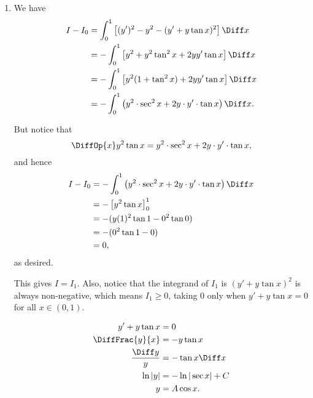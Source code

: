 \Question{\currfilebase}
\begin{enumerate}
    \item We have
          \begin{align*}
              I - I_0 & = \int_{0}^{1} \left[(y')^2 - y^2 - (y' + y \tan x)^2\right] \Diff x                 \\
                      & = - \int_{0}^{1} \left[y^2 + y^2 \tan^2 x + 2y y' \tan x\right] \Diff x              \\
                      & = - \int_{0}^{1} \left[y^2 (1 + \tan^2 x) + 2y y' \tan x \right] \Diff x             \\
                      & = - \int_{0}^{1} \left(y^2 \cdot \sec^2 x + 2y \cdot y' \cdot \tan x\right) \Diff x.
          \end{align*}

          But notice that
          \[
              \DiffOp{x} y^2 \tan x = y^2 \cdot \sec^2 x + 2y \cdot y' \cdot \tan x,
          \]
          and hence
          \begin{align*}
              I - I_0 & = - \int_{0}^{1} \left(y^2 \cdot \sec^2 x + 2y \cdot y' \cdot \tan x\right) \Diff x \\
                      & = - \left[y^2 \tan x\right]_{0}^{1}                                                 \\
                      & = - (y(1)^2 \tan 1 - 0^2 \tan 0)                                                    \\
                      & = - (0^2 \tan 1 - 0)                                                                \\
                      & = 0,
          \end{align*}
          as desired.

          This gives \(I = I_1\). Also, notice that the integrand of \(I_1\) is \((y' + y \tan x)^2\) is always non-negative, which means \(I_1 \geq 0\), taking \(0\) only when \(y' + y \tan x = 0\) for all \(x \in (0, 1)\).

          \begin{align*}
              y' + y \tan x     & = 0                  \\
              \DiffFrac{y}{x}   & = -y \tan x          \\
              \frac{\Diff y}{y} & = - \tan x \Diff x   \\
              \ln|y|            & = - \ln |\sec x| + C \\
              y                 & = A\cos x.           \\
          \end{align*}


\end{enumerate}
